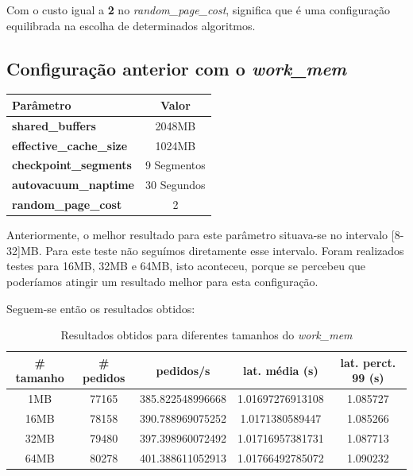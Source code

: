 Com o custo igual a \textbf{2} no \textit{random\_page\_cost}, significa que é uma configuração equilibrada na escolha de determinados algoritmos.

\newpage

\subsection{Configuração anterior com o \textit{work\_mem}}

\begin{table}[!h]
\center
\small
\begin{tabular}{|l|c|}
\hline
\textbf{Parâmetro} & \textbf{Valor} \\ \hline
\textbf{shared\_buffers} & 2048MB  \\ \hline
\textbf{effective\_cache\_size} & 1024MB  \\ \hline
\textbf{checkpoint\_segments} & 9 Segmentos \\ \hline
\textbf{autovacuum\_naptime} & 30 Segundos \\ \hline
\textbf{random\_page\_cost} & 2 \\ \hline
\end{tabular}
\end{table}

Anteriormente, o melhor resultado para este parâmetro situava-se no intervalo [8-32]MB. Para este teste não seguímos diretamente esse intervalo. Foram realizados testes para 16MB, 32MB e 64MB, isto aconteceu, porque se percebeu que poderíamos atingir um resultado melhor para esta configuração.

Seguem-se então os resultados obtidos:

\begin{table}[!h]
\center
\small
\begin{tabular}{|c|c|c|c|c|}
\hline
\textbf{\# tamanho} & \textbf{\# pedidos} & \textbf{pedidos/s} & \textbf{lat. média (s)} & \textbf{lat. perct. 99 (s)}  \\ \hline
1MB & 77165 & 385.822548996668 & 1.01697276913108 & 1.085727  \\ \hline
16MB & 78158 & 390.788969075252 & 1.0171380589447 & 1.085266  \\ \hline
32MB & 79480 & 397.398960072492 & 1.01716957381731 & 1.087713  \\ \hline
64MB & 80278 & 401.388611052913 & 1.01766492785072 & 1.090232  \\ \hline
\end{tabular}
\caption{Resultados obtidos para diferentes tamanhos do \textit{work\_mem}}
\end{table}

